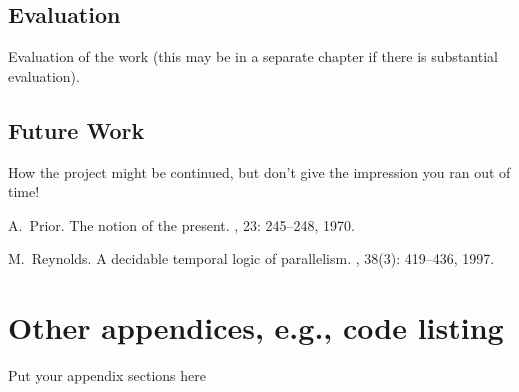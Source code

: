 \documentclass{report}
\begin{document}
\section{Evaluation}
Evaluation of the work (this may be in a separate chapter if there is substantial evaluation).
\section{Future Work}
How the project might be continued, but don't give the impression you ran out of time!

\appendix


\begin{thebibliography}{HHM99}


A.~Prior.
\newblock The notion of the present.
, 23:  245--248, 1970.


M.~Reynolds.
\newblock A decidable temporal logic of parallelism.
, 38(3):  419--436,
  1997.
\end{thebibliography}
\chapter{Other appendices, e.g., code listing}
Put your appendix sections here
\end{document}
